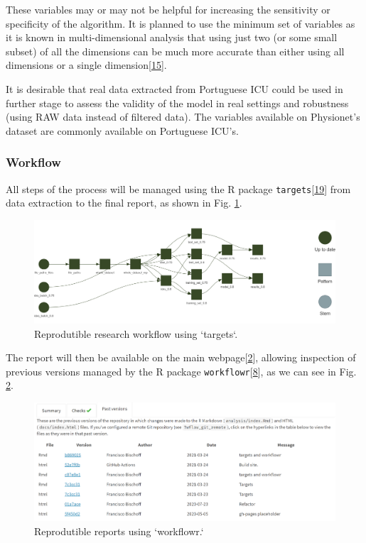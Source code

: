 \documentclass[
]{article}
\begin{document}
These variables may or may not be helpful for increasing the sensitivity
or specificity of the algorithm. It is planned to use the minimum set of
variables as it is known in multi-dimensional analysis that using just
two (or some small subset) of all the dimensions can be much more
accurate than either using all dimensions or a single
dimension{[}\protect\hyperlink{ref-gharghabi2018}{15}{]}.

It is desirable that real data extracted from Portuguese ICU could be
used in further stage to assess the validity of the model in real
settings and robustness (using RAW data instead of filtered data). The
variables available on Physionet's dataset are commonly available on
Portuguese ICU's.

\hypertarget{workflow}{%
\subsubsection{Workflow}\label{workflow}}

All steps of the process will be managed using the R package
\texttt{targets}{[}\protect\hyperlink{ref-landau2021}{19}{]} from data
extraction to the final report, as shown in Fig. \ref{fig:targets}.

\begin{figure}
\includegraphics[width=1\linewidth]{targets} \caption{Reprodutible research workflow using `targets`.}\label{fig:targets}
\end{figure}

The report will then be available on the main
webpage{[}\protect\hyperlink{ref-franz_website}{2}{]}, allowing
inspection of previous versions managed by the R package
\texttt{workflowr}{[}\protect\hyperlink{ref-workflowr2021}{8}{]}, as we
can see in Fig. \ref{fig:workflow_workflowr}.

\begin{figure}
\includegraphics[width=1\linewidth]{workflowr} \caption{Reprodutible reports using `workflowr.`}\label{fig:workflow_workflowr}
\end{figure}
\end{document}
